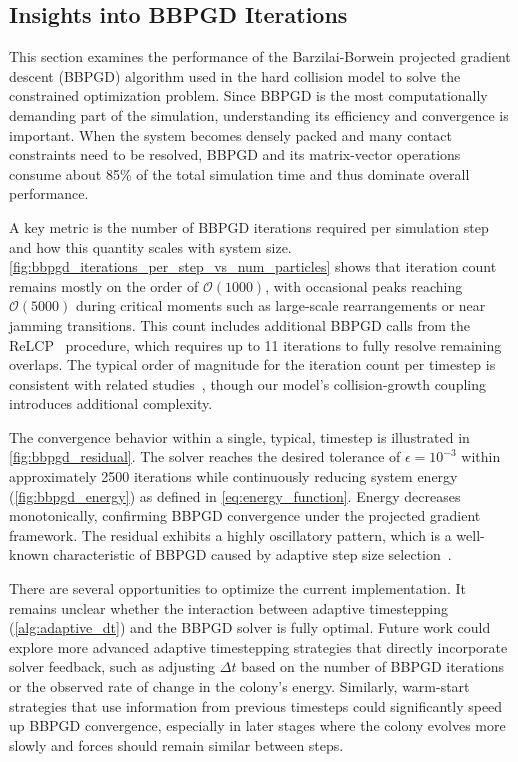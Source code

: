 \documentclass[conference]{IEEEtran}
\begin{document}
\subsection{Insights into BBPGD Iterations}

This section examines the performance of the Barzilai-Borwein projected gradient descent (BBPGD) algorithm used in the hard collision model to solve the constrained optimization problem. Since BBPGD is the most computationally demanding part of the simulation, understanding its efficiency and convergence is important. When the system becomes densely packed and many contact constraints need to be resolved, BBPGD and its matrix-vector operations consume about 85\% of the total simulation time and thus dominate overall performance.

A key metric is the number of BBPGD iterations required per simulation step and how this quantity scales with system size. \autoref{fig:bbpgd_iterations_per_step_vs_num_particles} shows that iteration count remains mostly on the order of $\mathcal{O}(1000)$, with occasional peaks reaching $\mathcal{O}(5000)$ during critical moments such as large-scale rearrangements or near jamming transitions. This count includes additional BBPGD calls from the ReLCP~\cite{Weady2024SM} procedure, which requires up to 11 iterations to fully resolve remaining overlaps. The typical order of magnitude for the iteration count per timestep is consistent with related studies~\cite{Yan2019}, though our model's collision-growth coupling introduces additional complexity.

The convergence behavior within a single, typical, timestep is illustrated in \autoref{fig:bbpgd_residual}. The solver reaches the desired tolerance of $\epsilon = 10^{-3}$ within approximately 2500 iterations while continuously reducing system energy (\autoref{fig:bbpgd_energy}) as defined in \autoref{eq:energy_function}. Energy decreases monotonically, confirming BBPGD convergence under the projected gradient framework. The residual exhibits a highly oscillatory pattern, which is a well-known characteristic of BBPGD caused by adaptive step size selection~\cite{BBPGD,Schneider2021}.

There are several opportunities to optimize the current implementation. It remains unclear whether the interaction between adaptive timestepping (\autoref{alg:adaptive_dt}) and the BBPGD solver is fully optimal. Future work could explore more advanced adaptive timestepping strategies that directly incorporate solver feedback, such as adjusting $\Delta t$ based on the number of BBPGD iterations or the observed rate of change in the colony's energy. Similarly, warm-start strategies that use information from previous timesteps could significantly speed up BBPGD convergence, especially in later stages where the colony evolves more slowly and forces should remain similar between steps.
\end{document}
